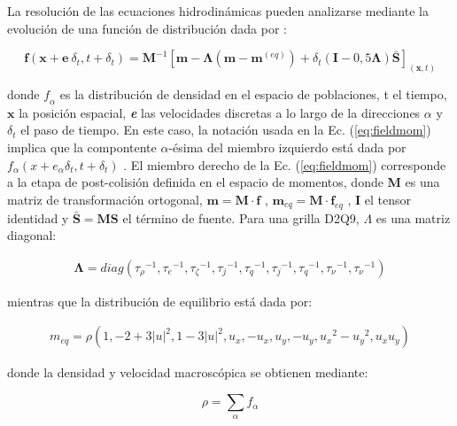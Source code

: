 La resolución de las ecuaciones hidrodinámicas pueden analizarse mediante la evolución de una función de distribución dada por \cite{li2013lattice}: 	

\begin{equation}
    \mathbf{f}(\mathbf{x} + \mathbf{e} \> \delta_{t} , t + \delta_{t}) = \mathbf{M}^{-1} \left[ \mathbf{m} - \mathbf{\Lambda}(\mathbf{m} - \mathbf{m}^{(eq)}) + \delta_{t} \left( \mathbf{I} - 0,5 \mathbf{\Lambda} \right) \mathbf{\bar{S}}  \right]_{(\mathbf{x},t)} 
    \label{eq:fieldmom}
\end{equation}

donde $\textit{f}_{\alpha}$ es la distribución de densidad en el espacio de poblaciones, t el tiempo, $\mathbf{x}$ la posición espacial, \textit{\textbf{e}} las velocidades discretas a lo largo de la direcciones $\alpha$ y $\delta_{t}$ el paso de tiempo. En este caso, la notación usada en la Ec. (\ref{eq:fieldmom}) implica que la compontente $\alpha$-ésima del miembro izquierdo está dada por $f_{\alpha}(x + e_{\alpha} \delta_{t}  , t + \delta_{t} )$ . El miembro derecho de la Ec. (\ref{eq:fieldmom}) corresponde a la etapa de post-colisión definida en el espacio de momentos, donde \textbf{M} es una matriz de transformación ortogonal, $\mathbf{m} = \mathbf{M} \cdot \mathbf{f}$ , $\mathbf{m}_{eq} = \mathbf{M} \cdot \mathbf{f}_{eq}$ , \textbf{I} el tensor identidad y $\mathbf{\bar{S}} = \mathbf{M} \mathbf{S}$ el término de fuente. Para una grilla D2Q9, $ \Lambda$ es una matriz diagonal:
    
\begin{align}
    \mathbf{\Lambda}  = diag ( {\tau_{\rho }}^{-1},{\tau_{e}}^{-1},{\tau_{\zeta }}^{-1},{\tau_{j}}^{-1},{\tau_{q}}^{-1},{\tau_{j}}^{-1},{\tau_{q}}^{-1},{\tau_{\nu }}^{-1},{\tau_{\nu}}^{-1}) 
    \label{eq:lambda}
\end{align}

mientras que la distribución de equilibrio está dada por:
        

\begin{align}
    m_{eq} =  \rho  \left( 1, - 2 + 3 {|u|}^{2} , 1 - 3{|u|}^{2} , u_{x} , - u_{x} , u_{y} , - u_{y} , {u_{x}}^{2} - {u_{y}}^{2} , u_{x} u_{y} \right) 
    \label{eq:m}
\end{align}


donde la densidad y velocidad macroscópica se obtienen mediante:

\begin{equation}
        \rho = \sum_{\alpha} f_{\alpha}
\end{equation}


